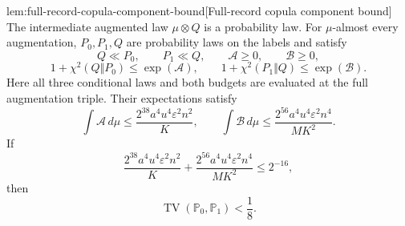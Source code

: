 \documentclass[11pt]{article}
\begin{document}
\begin{lemmav}{lem:full-record-copula-component-bound}[Full-record copula component bound]
The intermediate augmented law \(\mu\otimes Q\) is a probability law. For \(\mu\)-almost every augmentation, \(P_0,P_1,Q\) are probability laws on the labels and satisfy
\[
Q\ll P_0,\qquad P_1\ll Q,\qquad
\mathcal A\ge0,\qquad \mathcal B\ge0,
\]
\[
1+\chi^2(Q\Vert P_0)\le \exp(\mathcal A),
\qquad
1+\chi^2(P_1\Vert Q)\le \exp(\mathcal B).
\]
Here all three conditional laws and both budgets are evaluated at the full augmentation triple. Their expectations satisfy
\[
\int \mathcal A\,d\mu
\le \frac{2^{38}a^4u^4\varepsilon^2 n^2}{K},
\qquad
\int \mathcal B\,d\mu
\le \frac{2^{56}a^4u^4\varepsilon^2 n^4}{MK^2}.
\]
If
\[
\frac{2^{38}a^4u^4\varepsilon^2 n^2}{K}
+
\frac{2^{56}a^4u^4\varepsilon^2 n^4}{MK^2}
\le 2^{-16},
\]
then
\[
\operatorname{TV}(\mathbb P_0,\mathbb P_1)<\frac18.
\]
\end{lemmav}
\end{document}
